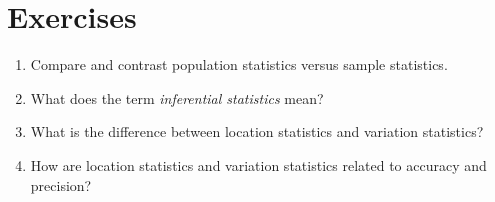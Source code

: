 \newpage
\section{Exercises}

\begin{enumerate}
\item Compare and contrast population statistics versus sample statistics.

\item What does the term \textit{inferential statistics} mean?

\item What is the difference between location statistics and variation statistics?

\item How are location statistics and variation statistics related to accuracy and precision?
\end{enumerate}



 